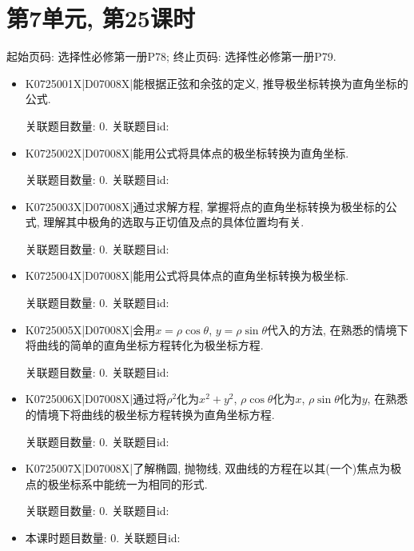 \section*{第7单元, 第25课时}
起始页码: 选择性必修第一册P78; 终止页码: 选择性必修第一册P79.
\begin{itemize}
\item K0725001X|D07008X|能根据正弦和余弦的定义, 推导极坐标转换为直角坐标的公式.

关联题目数量: 0. 关联题目id: 

\item K0725002X|D07008X|能用公式将具体点的极坐标转换为直角坐标.

关联题目数量: 0. 关联题目id: 

\item K0725003X|D07008X|通过求解方程, 掌握将点的直角坐标转换为极坐标的公式, 理解其中极角的选取与正切值及点的具体位置均有关.

关联题目数量: 0. 关联题目id: 

\item K0725004X|D07008X|能用公式将具体点的直角坐标转换为极坐标.

关联题目数量: 0. 关联题目id: 

\item K0725005X|D07008X|会用$x=\rho \cos\theta$, $y=\rho \sin \theta$代入的方法, 在熟悉的情境下将曲线的简单的直角坐标方程转化为极坐标方程.

关联题目数量: 0. 关联题目id: 

\item K0725006X|D07008X|通过将$\rho^2$化为$x^2+y^2$, $\rho\cos\theta$化为$x$, $\rho\sin\theta$化为$y$, 在熟悉的情境下将曲线的极坐标方程转换为直角坐标方程.

关联题目数量: 0. 关联题目id: 

\item K0725007X|D07008X|了解椭圆, 抛物线, 双曲线的方程在以其(一个)焦点为极点的极坐标系中能统一为相同的形式.

关联题目数量: 0. 关联题目id: 

\item 本课时题目数量: 0. 关联题目id: 

\end{itemize}

